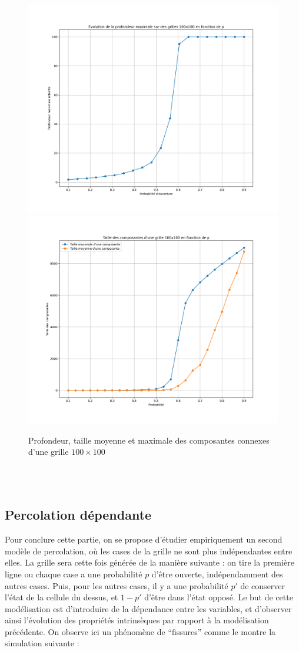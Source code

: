 \documentclass[11pt,a4paper]{article}
\begin{document}
\begin{figure}[htp]

\centering
\includegraphics[width=.5\textwidth]{./Pictures/profondeur.png}\hfill
\includegraphics[width=.5\textwidth]{./Pictures/taille.png}

\caption{Profondeur, taille moyenne et maximale des composantes connexes d'une grille $100\times 100$}
\label{fig:depth_size}

\end{figure}

~\\
~\\

\subsection{Percolation dépendante}

Pour conclure cette partie, on se propose d'étudier empiriquement un second modèle de percolation, où les cases de la grille ne sont plus indépendantes entre elles. La grille sera cette fois générée de la manière suivante : on tire la première ligne ou chaque case a une probabilité $p$ d'être ouverte, indépendamment des autres cases. Puis, pour les autres cases, il y a une probabilité $p'$ de conserver l'état de la cellule du dessus, et $1-p'$ d'être dans l'état opposé. Le but de cette modélisation est d'introduire de la dépendance entre les variables, et d'observer ainsi l'évolution des propriétés intrinsèques par rapport à la modélisation précédente. On observe ici un phénomène de ``fissures'' comme le montre la simulation suivante :
\end{document}
